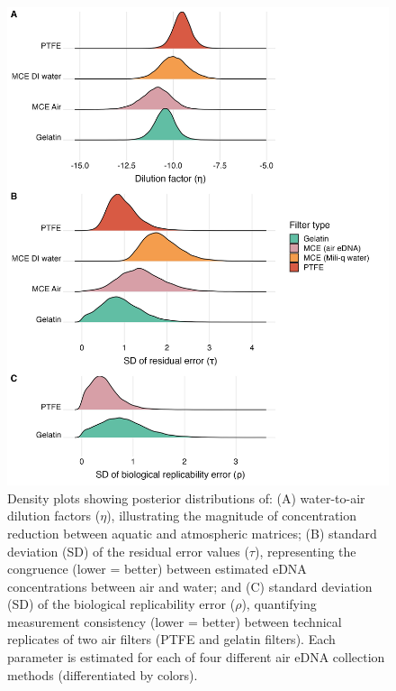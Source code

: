\documentclass{article}
\begin{document}
\begin{figure}[tbhp] 
\centering
\includegraphics[width=15.5cm]{Plots/Figure_2.jpg}  
\caption{Density plots showing posterior distributions of: (A) water-to-air dilution factors ($\eta$), illustrating the magnitude of concentration reduction between aquatic and atmospheric matrices; (B) standard deviation (SD) of the residual error values ($\tau$), representing the congruence (lower = better) between estimated eDNA concentrations between air and water; and (C) standard deviation (SD) of the biological replicability error ($\rho$), quantifying measurement consistency (lower = better) between 
technical replicates of two air filters (PTFE and gelatin filters). Each parameter is estimated for each of four different air eDNA collection methods (differentiated by colors).}
\label{fig:fig2}
\end{figure}

\end{document}
